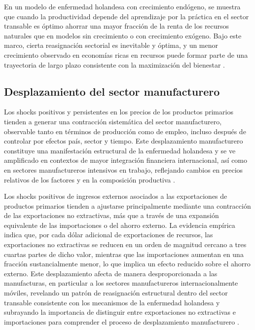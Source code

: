 \documentclass[../../PTFM.tex]{subfiles}
\begin{document}
	En un modelo de enfermedad holandesa con crecimiento endógeno, se muestra que cuando la productividad depende del aprendizaje por la práctica en el sector transable es óptimo ahorrar una mayor fracción de la renta de los recursos naturales que en modelos sin crecimiento o con crecimiento exógeno. Bajo este marco, cierta reasignación sectorial es inevitable y óptima, y un menor crecimiento observado en economías ricas en recursos puede formar parte de una trayectoria de largo plazo consistente con la maximización del bienestar \parencite{Matsen2005}.
	
	\subsection{Desplazamiento del sector manufacturero}
	\label{subsec:desplazamiento-sector-manufacturero}
	
	Los shocks positivos y persistentes en los precios de los productos primarios tienden a generar una contracción sistemática del sector manufacturero, observable tanto en términos de producción como de empleo, incluso después de controlar por efectos país, sector y tiempo. Este desplazamiento manufacturero constituye una manifestación estructural de la enfermedad holandesa y se ve amplificado en contextos de mayor integración financiera internacional, así como en sectores manufactureros intensivos en trabajo, reflejando cambios en precios relativos de los factores y en la composición productiva \parencite{Ismail2010}.
	
	Los shocks positivos de ingresos externos asociados a las exportaciones de productos primarios tienden a ajustarse principalmente mediante una contracción de las exportaciones no extractivas, más que a través de una expansión equivalente de las importaciones o del ahorro externo. La evidencia empírica indica que, por cada dólar adicional de exportaciones de recursos, las exportaciones no extractivas se reducen en un orden de magnitud cercano a tres cuartas partes de dicho valor, mientras que las importaciones aumentan en una fracción sustancialmente menor, lo que implica un efecto reducido sobre el ahorro externo. Este desplazamiento afecta de manera desproporcionada a las manufacturas, en particular a los sectores manufactureros internacionalmente móviles, revelando un patrón de reasignación estructural dentro del sector transable consistente con los mecanismos de la enfermedad holandesa y subrayando la importancia de distinguir entre exportaciones no extractivas e importaciones para comprender el proceso de desplazamiento manufacturero \parencite{Harding2016}.	
	
\end{document}
